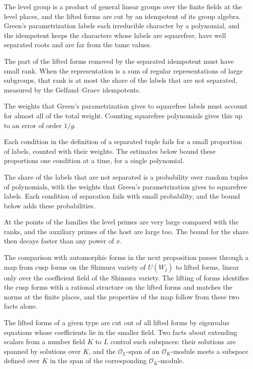 The level group is a product of general linear groups over the finite fields at the level places,
and the lifted forms are cut by an idempotent of its group algebra. Green's parametrization labels
each irreducible character by a polynomial, and the idempotent keeps the characters whose labels
are squarefree, have well separated roots and are far from the tame values.

The part of the lifted forms removed by the separated idempotent must have small rank. When the
representation is a sum of regular representations of large subgroups, that rank is at most the
share of the labels that are not separated, measured by the Gelfand--Graev idempotents.

The weights that Green's parametrization gives to squarefree labels must account for almost all of
the total weight. Counting squarefree polynomials gives this up to an error of order $1/g$.

Each condition in the definition of a separated tuple fails for a small proportion of labels,
counted with their weights. The estimates below bound these proportions one condition at a time,
for a single polynomial.

The share of the labels that are not separated is a probability over random tuples of
polynomials, with the weights that Green's parametrization gives to squarefree labels. Each
condition of separation fails with small probability, and the bound below adds these
probabilities.

At the points of the families the level primes are very large compared with the ranks, and the
auxiliary primes of the host are large too. The bound for the share then decays faster than any
power of $x$.

The comparison with automorphic forms in the next proposition passes through a map from cusp forms
on the Shimura variety of $U(W_j)$ to lifted forms, linear only over the coefficient field of the
Shimura variety. The lifting of forms identifies the cusp forms with a rational structure on the
lifted forms and matches the norms at the finite places, and the properties of the map follow from
these two facts alone.

The lifted forms of a given type are cut out of all lifted forms by eigenvalue equations whose
coefficients lie in the smaller field. Two facts about extending scalars from a number field $K$ to
$L$ control such subspaces: their solutions are spanned by solutions over $K$, and the
$\mathcal O_L$-span of an $\mathcal O_K$-module meets a subspace defined over $K$ in the span of the
corresponding $\mathcal O_K$-module.

